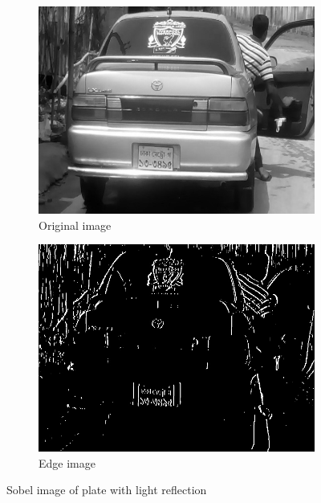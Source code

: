 \begin{figure}
\begin{subfigure}{0.5\textwidth}
    \centering
    \includegraphics[width=0.9\linewidth]{./img/experiment/stage.2/light}
    \caption{Original image}
\end{subfigure}
\begin{subfigure}{0.5\textwidth}
    \centering
    \includegraphics[width=0.9\linewidth]{./img/experiment/stage.3/light}
    \caption{Edge image}
\end{subfigure}
\caption{Sobel image of plate with light reflection}
\label{fig:SobelResult3}
\end{figure}
